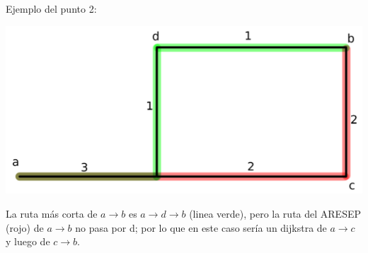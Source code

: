 Ejemplo del punto 2:


\begin{center}
	\includegraphics[scale=.4]{imagenes/dijkstra.png}	
\end{center}

La ruta más corta de $a\rightarrow b$ es $a\rightarrow d\rightarrow b$ (linea verde), pero la ruta del ARESEP (rojo) de $a\rightarrow b$ no pasa por d; por lo que en este caso sería un dijkstra de $a \rightarrow c$ y luego de $c\rightarrow b$.

\newpage
